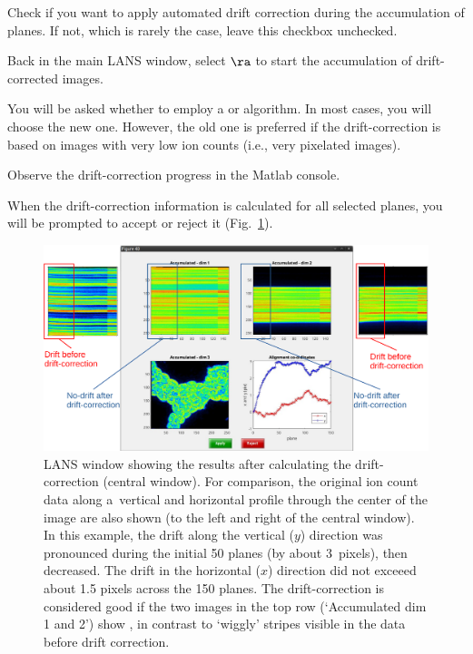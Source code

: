 \s Check  if you want to apply automated drift correction during the accumulation of planes. If not, which is rarely the case, leave this checkbox unchecked.

\s Back in the main LANS window, select  $\ra$  to start the accumulation of drift-corrected images. 

\bul You will be asked whether to employ a  or  algorithm. In most cases, you will choose the new one. However, the old one is preferred if the drift-correction is based on images with very low ion counts (i.e., very pixelated images).

\bul Observe the drift-correction progress in the Matlab console. 

\bul When the drift-correction information is calculated for all selected planes, you will be prompted to accept or reject it (Fig.~\ref{fig:drift-correction}). 

\begin{figure}[!ht]
\centering
\includegraphics[width=\textwidth]{figs3/LANS-drift-correction}
\caption{\label{fig:drift-correction}%
LANS window showing the results after calculating the drift-correction (central window). For comparison, the original ion count data along a~vertical and horizontal profile through the center of the image are also shown (to the left and right of the central window). In this example, the drift along the vertical ($y$) direction was pronounced during the initial 50 planes (by about 3~pixels), then decreased. The drift in the horizontal ($x$) direction did not exceeed about 1.5 pixels across the 150 planes. The drift-correction is considered good if the two images in the top row (`Accumulated dim 1 and 2') show , in contrast to `wiggly' stripes visible in the data before drift correction.}
\end{figure}

